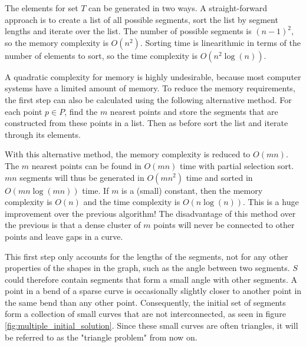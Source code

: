 \documentclass[11pt]{article}
\begin{document}

The elements for set $T$ can be generated in two ways. A straight-forward approach is to create a list of all possible segments, sort the list by segment lengths and iterate over the list. The number of possible segments is $(n-1)^2$, so the memory complexity is $O(n^2)$. Sorting time is linearithmic in terms of the number of elements to sort, so the time complexity is $O(n^2\log(n))$.

A quadratic complexity for memory is highly undesirable, because most computer systems have a limited amount of memory. To reduce the memory requirements, the first step can also be calculated using the following alternative method. For each point $p \in P$, find the $m$ nearest points and store the segments that are constructed from these points in a list. Then as before sort the list and iterate through its elements.

With this alternative method, the memory complexity is reduced to $O(mn)$. The $m$ nearest points can be found in $O(mn)$ time with partial selection sort.
 $mn$ segments will thus be generated in $O(mn^2)$ time and sorted in $O(mn\log(mn))$ time. If $m$ is a (small) constant, then the memory complexity is $O(n)$ and the time complexity is $O(n\log(n))$. This is a huge improvement over the previous algorithm! The disadvantage of this method over the previous is that a dense cluster of $m$ points will never be connected to other points and leave gaps in a curve.

This first step only accounts for the lengths of the segments, not for any other properties of the shapes in the graph, such as the angle between two segments. $S$ could therefore contain segments that form a small angle with other segments.
A point in a bend of a sparse curve is occasionally slightly closer to another point in the same bend than any other point. Consequently, the initial set of segments form a collection of small curves that are not interconnected, as seen in figure \ref{fig:multiple_initial_solution}. Since these small curves are often triangles, it will be referred to as the "triangle problem" from now on.
\end{document}
